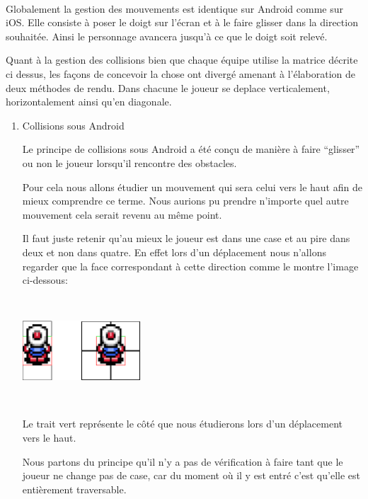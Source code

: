 				$\,$
			
				Globalement la gestion des mouvements est identique sur Android comme sur
				iOS.
				Elle consiste à poser le doigt sur l'écran et à le faire glisser dans la
				direction souhaitée. Ainsi le personnage avancera jusqu'à ce que le doigt
				soit relevé.				
				
				Quant à la gestion des collisions bien que chaque équipe utilise la matrice
				décrite ci dessus, les façons de concevoir la chose ont divergé amenant à
				l'élaboration de deux méthodes de rendu. Dans chacune le joueur se deplace
				verticalement, horizontalement ainsi qu'en diagonale.
				
				\begin{enumerate}
				  \item Collisions sous Android
				  
				  		Le principe de collisions sous Android a été conçu de manière à faire
				  		``glisser'' ou non le joueur lorsqu'il rencontre des obstacles.
				  		
				  		
				  		Pour cela nous allons étudier un mouvement qui sera celui vers le haut
				  		afin de mieux comprendre ce terme.
				  		Nous aurions pu prendre n'importe quel autre mouvement cela serait
				  		revenu au même point.
				  		
				  		Il faut juste retenir qu'au mieux le joueur est dans une case et au pire
				  		dans deux et non dans quatre. En effet lors d'un déplacement nous
				  		n'allons regarder que la face correspondant à cette direction comme le montre
				  		l'image ci-dessous:
				  		
				  		$\,$
				  		
						\begin{center}						
							\includegraphics[width=168px,height=84px]{Developpement/Img/ex2.eps}
						\end{center}
						
				  		$\,$				  		
				  		
				  		Le trait vert représente le côté que nous étudierons lors d'un
				  		déplacement vers le haut.
				  		
				  		
				  		Nous partons du principe qu'il n'y a pas de vérification à faire tant
				  		que le joueur ne change pas de case, car du moment où il y est entré
				  		c'est qu'elle est entièrement traversable.
				  		

\end{enumerate}
